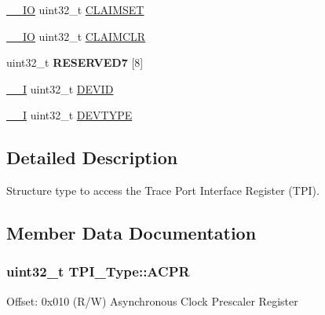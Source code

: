\begin{DoxyCompactItemize}
\item 
\hyperlink{core__cm4_8h_aec43007d9998a0a0e01faede4133d6be}{\+\_\+\+\_\+\+IO} uint32\+\_\+t \hyperlink{struct_t_p_i___type_a2e4d5a07fabd771fa942a171230a0a84}{C\+L\+A\+I\+M\+S\+ET}
\item 
\hyperlink{core__cm4_8h_aec43007d9998a0a0e01faede4133d6be}{\+\_\+\+\_\+\+IO} uint32\+\_\+t \hyperlink{struct_t_p_i___type_a44efa6045512c8d4da64b0623f7a43ad}{C\+L\+A\+I\+M\+C\+LR}
\item 
uint32\+\_\+t {\bfseries R\+E\+S\+E\+R\+V\+E\+D7} \mbox{[}8\mbox{]}\hypertarget{struct_t_p_i___type_a476ca23fbc9480f1697fbec871130550}{}\label{struct_t_p_i___type_a476ca23fbc9480f1697fbec871130550}

\item 
\hyperlink{core__cm4_8h_af63697ed9952cc71e1225efe205f6cd3}{\+\_\+\+\_\+I} uint32\+\_\+t \hyperlink{struct_t_p_i___type_a4b2e0d680cf7e26728ca8966363a938d}{D\+E\+V\+ID}
\item 
\hyperlink{core__cm4_8h_af63697ed9952cc71e1225efe205f6cd3}{\+\_\+\+\_\+I} uint32\+\_\+t \hyperlink{struct_t_p_i___type_a16d12c5b1e12f764fa3ec4a51c5f0f35}{D\+E\+V\+T\+Y\+PE}
\end{DoxyCompactItemize}


\subsection{Detailed Description}
Structure type to access the Trace Port Interface Register (T\+PI). 

\subsection{Member Data Documentation}
\subsubsection[{\texorpdfstring{A\+C\+PR}{ACPR}}]{ uint32\+\_\+t T\+P\+I\+\_\+\+Type\+::\+A\+C\+PR}\hypertarget{struct_t_p_i___type_ad75832a669eb121f6fce3c28d36b7fab}{}\label{struct_t_p_i___type_ad75832a669eb121f6fce3c28d36b7fab}
Offset\+: 0x010 (R/W) Asynchronous Clock Prescaler Register 
